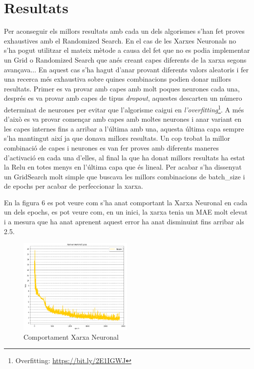 \documentclass[10pt,a4paper,twocolumn,twoside]{article}
\begin{document}
\section{Resultats}
Per aconseguir els millors resultats amb cada un dels algorismes s'han fet proves exhaustives amb el Randomized Search. En el cas de les Xarxes Neuronals no s'ha pogut utilitzar el mateix mètode a causa del fet que no es podia implementar un Grid o Randomized Search que anés creant capes diferents de la xarxa segons avançava... En aquest cas s'ha hagut d'anar provant diferents valors aleatoris i fer una recerca més exhaustiva sobre quines combinacions podien donar millors resultats. Primer es va provar amb capes amb molt poques neurones cada una, després es va provar amb capes de tipus \textit{dropout}, aquestes descarten un número determinat de neurones per evitar que l'algorisme caigui en \textit{l'overfitting}\footnote{Overfitting:      \url{https://bit.ly/2E1IGWJ}}. A més d'això es va provar començar amb capes amb moltes neurones i anar variant en les capes internes fins a arribar a l'última amb una, aquesta última capa sempre s'ha mantingut així ja que donava millors resultats. Un cop trobat la millor combinació de capes i neurones es van fer proves amb diferents maneres d'activació en cada una d'elles, al final la que ha donat millors resultats ha estat la Relu en totes menys en l'última capa que és lineal. Per acabar s'ha dissenyat un GridSearch molt simple que buscava les millors combinacions de batch\_size i de epochs per acabar de perfeccionar la xarxa. 

En la figura 6 es pot veure com s'ha anat comportant la Xarxa Neuronal en cada un dels epochs, es pot veure com, en un inici, la xarxa tenia un MAE molt elevat i a mesura que ha anat aprenent aquest error ha anat disminuint fins arribar als 2.5.
\begin{figure}[!h]
\centering
	\includegraphics[width=0.5\textwidth]{../img/analisiNN}
	\caption{Comportament Xarxa Neuronal}
	\label{fig-analisiNN}
\end{figure}
\end{document}
